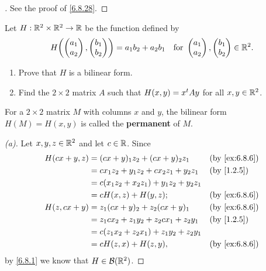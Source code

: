 \begin{proof}[]
  See the proof of \cref{6.8.28}.
\end{proof}

\exercisesection

\setcounter{ex}{5}
\begin{ex}\label{ex:6.8.6}
  Let \(H : \mathbb{R}^2 \times \mathbb{R}^2 \to \mathbb{R}\) be the function defined by
  \[
    H\pa{\begin{pmatrix}
        a_1 \\
        a_2
      \end{pmatrix}, \begin{pmatrix}
        b_1 \\
        b_2
      \end{pmatrix}} = a_1 b_2 + a_2 b_1 \quad \text{for } \begin{pmatrix}
      a_1 \\
      a_2
    \end{pmatrix}, \begin{pmatrix}
      b_1 \\
      b_2
    \end{pmatrix} \in \R^2.
  \]
  \begin{enumerate}
    \item Prove that \(H\) is a bilinear form.
    \item Find the \(2 \times 2\) matrix \(A\) such that \(H(x, y) = {x}^{t} A y\) for all \(x, y \in \mathbb{R}^2\).
  \end{enumerate}
  For a \(2 \times 2\) matrix \(M\) with columns \(x\) and \(y\), the bilinear form \(H(M) = H(x, y)\) is called the \textbf{permanent} of \(M\).
\end{ex}

\begin{proof}[(a)]
  Let \(x, y, z \in \mathbb{R}^2\) and let \(c \in \mathbb{R}\).
  Since
  \begin{align*}
    H(cx + y, z) & = (cx + y)_1 z_2 + (cx + y)_2 z_1           &  & \by{ex:6.8.6} \\
                 & = c x_1 z_2 + y_1 z_2 + c x_2 z_1 + y_2 z_1 &  & \by{1.2.5}    \\
                 & = c (x_1 z_2 + x_2 z_1) + y_1 z_2 + y_2 z_1                    \\
                 & = c H(x, z) + H(y, z);                      &  & \by{ex:6.8.6} \\
    H(z, cx + y) & = z_1 (cx + y)_2 + z_2 (cx + y)_1           &  & \by{ex:6.8.6} \\
                 & = z_1 c x_2 + z_1 y_2 + z_2 c x_1 + z_2 y_1 &  & \by{1.2.5}    \\
                 & = c (z_1 x_2 + z_2 x_1) + z_1 y_2 + z_2 y_1                    \\
                 & = c H(z, x) + H(z, y),                      &  & \by{ex:6.8.6}
  \end{align*}
  by \cref{6.8.1} we know that \(H \in \mathcal{B}(\mathbb{R}^2)\).
\end{proof}

